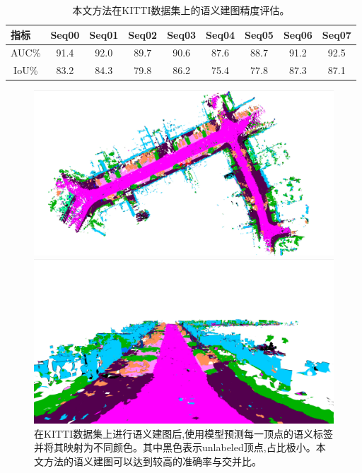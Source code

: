 \begin{table}[htbp]
    \centering
    \caption{本文方法在KITTI数据集上的语义建图精度评估。}\label{kittimetrics}
    \begin{tabular}[htbp]{cccccccccc}
        \toprule
        \multicolumn{2}{l}{指标} & Seq00 & Seq01 & Seq02 &Seq03&Seq04&Seq05&Seq06&Seq07 \\
        \midrule
        \multicolumn{2}{l}{AUC\%} & 91.4 & 92.0 & 89.7 & 90.6 &87.6&88.7&91.2&92.5\\
        \multicolumn{2}{c}{IoU\%} & 83.2& 84.3&79.8&86.2&75.4&77.8&87.3&87.1 \\
        \bottomrule
    \end{tabular}
\end{table}
\begin{figure}[htbp]
	\centering
	\begin{minipage}{0.5\linewidth}
		\centering
		\includegraphics[width=1\linewidth]{figures/sem1.png}
	\end{minipage}\hfill
	\begin{minipage}{0.5\linewidth}
		\centering
		\includegraphics[width=1\linewidth]{figures/sem2.png}
	\end{minipage}
    \caption{在KITTI数据集上进行语义建图后,使用模型预测每一顶点的语义标签并将其映射为不同颜色。其中黑色表示unlabeled顶点,占比极小。本文方法的语义建图可以达到较高的准确率与交并比。}\label{semresult}
\end{figure}

